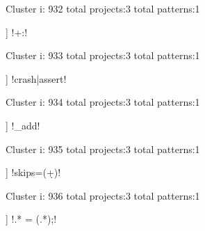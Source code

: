 Cluster i: 932
total projects:3
total patterns:1
\begin{multicols}{1}
\begin{description}[noitemsep,topsep=0pt]
\item [[3] ] \cverb!\*\s[^:]+:!
\end{description}
\end{multicols}







Cluster i: 933
total projects:3
total patterns:1
\begin{multicols}{1}
\begin{description}[noitemsep,topsep=0pt]
\item [[3] ] \cverb!crash|assert!
\end{description}
\end{multicols}







Cluster i: 934
total projects:3
total patterns:1
\begin{multicols}{1}
\begin{description}[noitemsep,topsep=0pt]
\item [[3] ] \cverb!\ndevice_add!
\end{description}
\end{multicols}







Cluster i: 935
total projects:3
total patterns:1
\begin{multicols}{1}
\begin{description}[noitemsep,topsep=0pt]
\item [[3] ] \cverb!skips=(\d+)!
\end{description}
\end{multicols}







Cluster i: 936
total projects:3
total patterns:1
\begin{multicols}{1}
\begin{description}[noitemsep,topsep=0pt]
\item [[3] ] \cverb!.* = (.*);\n!
\end{description}
\end{multicols}







